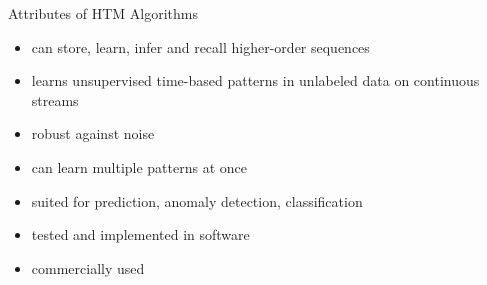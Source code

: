 \begin{frame}[c]{Attributes of HTM Algorithms}
    \begin{itemize}[<+(1)->]
        \item can store, learn, infer and recall higher-order sequences
        \item learns unsupervised time-based patterns in unlabeled data on continuous streams
        \item robust against noise
        \item can learn multiple patterns at once
        \item suited for prediction, anomaly detection, classification
        \item tested and implemented in software
        \item commercially used
    \end{itemize}
\end{frame}



